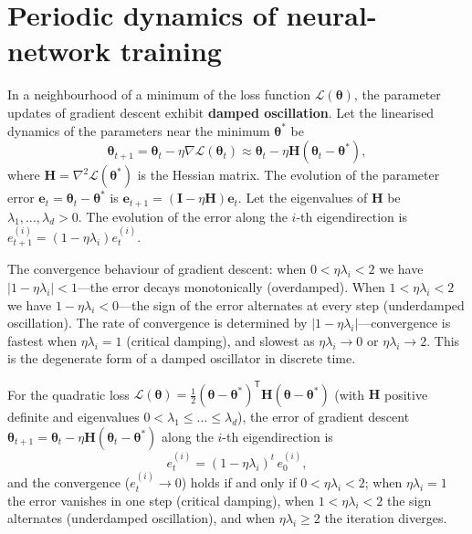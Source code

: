 \section{Periodic dynamics of neural-network training}

\begin{definition}\label{def:gradient_descent_oscillation}
In a neighbourhood of a minimum of the loss function $\mathcal{L}(\boldsymbol{\theta})$, the parameter updates of gradient descent exhibit \textbf{damped oscillation}. Let the linearised dynamics of the parameters near the minimum $\boldsymbol{\theta}^*$ be
\[
\boldsymbol{\theta}_{t+1} = \boldsymbol{\theta}_t - \eta \nabla \mathcal{L}(\boldsymbol{\theta}_t) \approx \boldsymbol{\theta}_t - \eta \mathbf{H} (\boldsymbol{\theta}_t - \boldsymbol{\theta}^*),
\]
where $\mathbf{H} = \nabla^2 \mathcal{L}(\boldsymbol{\theta}^*)$ is the Hessian matrix. The evolution of the parameter error $\mathbf{e}_t = \boldsymbol{\theta}_t - \boldsymbol{\theta}^*$ is $\mathbf{e}_{t+1} = (\mathbf{I} - \eta \mathbf{H}) \mathbf{e}_t$. Let the eigenvalues of $\mathbf{H}$ be $\lambda_1, \dots, \lambda_d > 0$. The evolution of the error along the $i$-th eigendirection is $e_{t+1}^{(i)} = (1 - \eta \lambda_i) e_t^{(i)}$.

The convergence behaviour of gradient descent: when $0 < \eta \lambda_i < 2$ we have $|1 - \eta \lambda_i| < 1$---the error decays monotonically (overdamped). When $1 < \eta \lambda_i < 2$ we have $1 - \eta \lambda_i < 0$---the sign of the error alternates at every step (underdamped oscillation). The rate of convergence is determined by $|1 - \eta \lambda_i|$---convergence is fastest when $\eta \lambda_i = 1$ (critical damping), and slowest as $\eta \lambda_i \to 0$ or $\eta \lambda_i \to 2$. This is the degenerate form of a damped oscillator in discrete time.
\end{definition}

\begin{lemma}\label{ch32_gd_eigen}
For the quadratic loss $\mathcal{L}(\boldsymbol{\theta}) = \frac{1}{2}(\boldsymbol{\theta}-\boldsymbol{\theta}^*)^{\mathsf T}\mathbf{H}(\boldsymbol{\theta}-\boldsymbol{\theta}^*)$ (with $\mathbf{H}$ positive definite and eigenvalues $0 < \lambda_1 \le \dots \le \lambda_d$), the error of gradient descent $\boldsymbol{\theta}_{t+1} = \boldsymbol{\theta}_t - \eta\mathbf{H}(\boldsymbol{\theta}_t - \boldsymbol{\theta}^*)$ along the $i$-th eigendirection is
\[
e_t^{(i)} = (1 - \eta\lambda_i)^t \, e_0^{(i)},
\]
and the convergence ($e_t^{(i)} \to 0$) holds if and only if $0 < \eta\lambda_i < 2$; when $\eta\lambda_i = 1$ the error vanishes in one step (critical damping), when $1 < \eta\lambda_i < 2$ the sign alternates (underdamped oscillation), and when $\eta\lambda_i \ge 2$ the iteration diverges.
\end{lemma}

